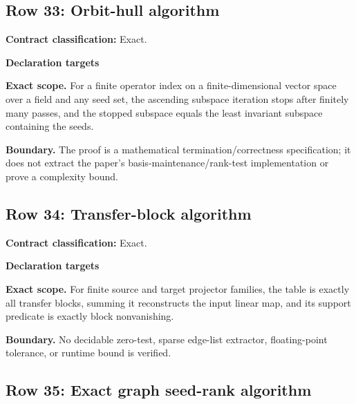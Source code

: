 \medskip
{}\subsection{Row 33: Orbit-hull algorithm}
\label{row:33}
\textbf{Contract classification:} Exact.
\par\smallskip\textbf{Declaration targets}\par
{\small\noindent{}\par}
{\small\noindent{}\par}
\medskip\noindent\textbf{Exact scope.} For a finite operator index on a finite-dimensional vector space over a field and any seed set, the ascending subspace iteration stops after finitely many passes, and the stopped subspace equals the least invariant subspace containing the seeds.
\par\smallskip\noindent\textbf{Boundary.} The proof is a mathematical termination/correctness specification; it does not extract the paper's basis-maintenance/rank-test implementation or prove a complexity bound.
\medskip
{}\subsection{Row 34: Transfer-block algorithm}
\label{row:34}
\textbf{Contract classification:} Exact.
\par\smallskip\textbf{Declaration targets}\par
{\small\noindent{}\par}
{\small\noindent{}\par}
{\small\noindent{}\par}
{\small\noindent{}\par}
\medskip\noindent\textbf{Exact scope.} For finite source and target projector families, the table is exactly all transfer blocks, summing it reconstructs the input linear map, and its support predicate is exactly block nonvanishing.
\par\smallskip\noindent\textbf{Boundary.} No decidable zero-test, sparse edge-list extractor, floating-point tolerance, or runtime bound is verified.
\medskip
{}\subsection{Row 35: Exact graph seed-rank algorithm}
